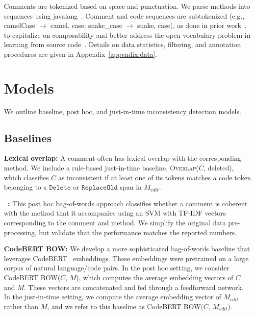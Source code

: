 \documentclass[letterpaper]{article} %
\newcommand{\CodeIn}[1]{{\ifmmode{\mathtt{#1}}\else$\mathtt{#1}$\fi}}
\newcommand{\Comment}{$C$}
\newcommand{\NewCode}{$M$}
\newcommand{\Posthoc}{post hoc}
\newcommand{\JustInTime}{just-in-time}
\newcommand{\EditCode}{$M_{edit}$}
\newcommand{\HasOverlap}{\textsc{Overlap}}
\newcommand{\DeletedCode}{deleted}
\newcommand{\Bert}{CodeBERT BOW}
\newcommand{\PosthocBert}{\Bert{}(\Comment{}, \NewCode{})}
\newcommand{\JustInTimeBert}{\Bert{}(\Comment{}, \EditCode{})}
\begin{document}
Comments are tokenized based on space and punctuation. We parse methods into sequences using javalang~\cite{javalang}. Comment and code sequences are subtokenized (e.g., camelCase $\rightarrow$ camel, case; snake\_case $\rightarrow$ snake, case), as done in prior
work~\cite{Alon2019Code2Seq,FernandesSummarization}, to capitalize on composability and better address the open vocabulary problem in learning from source code~\cite{CvitovicOpenVocab}. 
Details on data statistics, filtering, and annotation procedures are given in Appendix~\ref{appendix:data}.



\section{Models}
We outline baseline, \Posthoc{}, and \JustInTime{} inconsistency detection models.

\subsection{Baselines}
\label{sec:baselines}
\noindent\textbf{Lexical overlap:} A comment often has lexical overlap with the corresponding method. We include a rule-based \JustInTime{} baseline, \HasOverlap{}(\Comment{}, \DeletedCode{}), which classifies \Comment{} as inconsistent if at least one of its tokens matches a code token belonging to a \CodeIn{Delete} or \CodeIn{ReplaceOld} span in \EditCode{}.

\noindent\textbf{\citeauthor{Corazza18}~:} This \Posthoc{} bag-of-words approach classifies whether a comment is coherent with the method that it accompanies using an SVM with TF-IDF vectors corresponding to the comment and method. We simplify the original data pre-processing, but validate that the performance matches the reported numbers.

\noindent\textbf{\Bert{}:} We develop a more sophisticated bag-of-words baseline that leverages CodeBERT~\cite{Feng2020CodeBERTAP} embeddings. These embeddings were pretrained on a large corpus of natural language/code pairs. In the \Posthoc{} setting, we consider \PosthocBert{}, which computes the average embedding vectors of \Comment{} and \NewCode{}. These vectors are concatenated and fed through a feedforward network. In the \JustInTime{} setting, we compute the average embedding vector of \EditCode{} rather than \NewCode{}, and we refer to this baseline as \JustInTimeBert{}.
\end{document}
